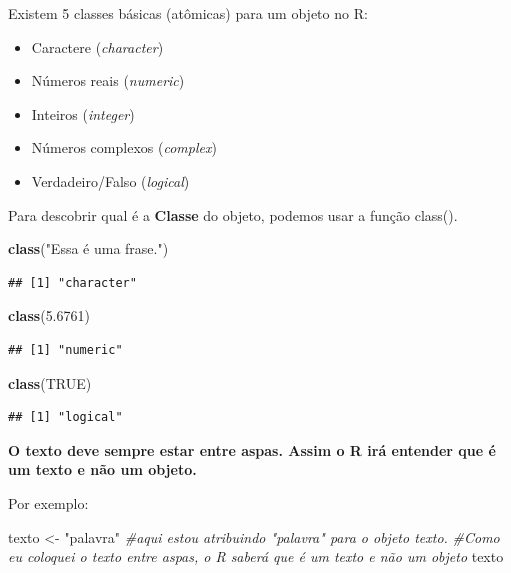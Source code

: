 \documentclass[
]{book}
\newenvironment{Shaded}{\begin{snugshade}}{\end{snugshade}}
\newcommand{\CommentTok}[1]{\textcolor[rgb]{0.56,0.35,0.01}{\textit{#1}}}
\newcommand{\FloatTok}[1]{\textcolor[rgb]{0.00,0.00,0.81}{#1}}
\newcommand{\KeywordTok}[1]{\textcolor[rgb]{0.13,0.29,0.53}{\textbf{#1}}}
\newcommand{\NormalTok}[1]{#1}
\newcommand{\OtherTok}[1]{\textcolor[rgb]{0.56,0.35,0.01}{#1}}
\newcommand{\StringTok}[1]{\textcolor[rgb]{0.31,0.60,0.02}{#1}}
\providecommand{\tightlist}{%
  \setlength{\itemsep}{0pt}\setlength{\parskip}{0pt}}
\begin{document}
Existem 5 classes básicas (atômicas) para um objeto no R:

\begin{itemize}
\tightlist
\item
  Caractere (\emph{character})
\item
  Números reais (\emph{numeric})
\item
  Inteiros (\emph{integer})
\item
  Números complexos (\emph{complex})
\item
  Verdadeiro/Falso (\emph{logical})
\end{itemize}

Para descobrir qual é a \textbf{Classe} do objeto, podemos usar a função
class().

\begin{Shaded}
\begin{Highlighting}[]
\KeywordTok{class}\NormalTok{(}\StringTok{"Essa é uma frase."}\NormalTok{)}
\end{Highlighting}
\end{Shaded}

\begin{verbatim}
## [1] "character"
\end{verbatim}

\begin{Shaded}
\begin{Highlighting}[]
\KeywordTok{class}\NormalTok{(}\FloatTok{5.6761}\NormalTok{)}
\end{Highlighting}
\end{Shaded}

\begin{verbatim}
## [1] "numeric"
\end{verbatim}

\begin{Shaded}
\begin{Highlighting}[]
\KeywordTok{class}\NormalTok{(}\OtherTok{TRUE}\NormalTok{)}
\end{Highlighting}
\end{Shaded}

\begin{verbatim}
## [1] "logical"
\end{verbatim}

\textbf{O texto deve sempre estar entre aspas. Assim o R irá entender
que é um texto e não um objeto.}

Por exemplo:

\begin{Shaded}
\begin{Highlighting}[]
\NormalTok{texto <-}\StringTok{ "palavra"} \CommentTok{#aqui estou atribuindo "palavra" para o objeto texto. }
                \CommentTok{#Como eu coloquei o texto entre aspas, o R saberá que é um texto e não um objeto}
\NormalTok{texto}
\end{Highlighting}
\end{Shaded}
\end{document}
